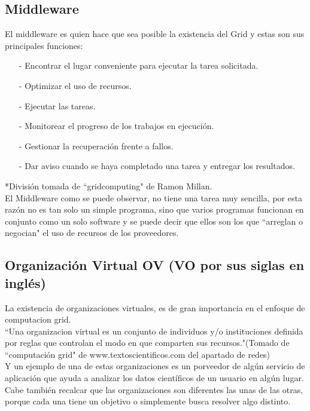 \documentclass[12pt]{article}
\begin{document}
{{\subsection{Middleware}
El middleware es quien hace que sea posible la existencia del Grid y estas son sus principales funciones:
\begin{itemize}
\item[-]Encontrar el lugar conveniente para ejecutar la tarea solicitada.
\item[-]Optimizar el uso de recursos.
\item[-]Ejecutar las tareas.
\item[-]Monitorear el progreso de los trabajos en ejecuci\'on.
\item[-]Gestionar la recuperaci\'on frente a fallos.
\item[-]Dar aviso cuando se haya completado una tarea y entregar los resultados.
\end{itemize}
*Divisi\'on tomada de ``gridcomputing" de Ramon Millan.\\
\vspace{0.2in}
El Middleware como se puede observar, no tiene una tarea muy sencilla, por esta raz\'on no es tan solo un simple programa, sino que varios programas funcionan en conjunto como un solo software y se puede decir que ellos son los que ``arreglan o negocian" \hspace{0.01in} el uso de recursos de los proveedores.

\subsection{Organizaci\'on Virtual OV (VO por sus siglas en ingl\'es)}
La existencia de organizaciones virtuales, es de gran importancia en el enfoque de computacion grid.\\\vspace{0.1in}
``Una organizacion virtual es un conjunto de individuos y/o instituciones definida por reglas que controlan el modo en que comparten sus recursos."(Tomado de ``computaci\'on grid" de www.textoscientificos.com del apartado de redes)\\\vspace{0.1in}
Y un ejemplo de una de estas organizaciones es un porveedor de alg\'un servicio de aplicaci\'on que ayuda a analizar los datos cient\'ificos de un usuario en alg\'un lugar. Cabe tambi\'en recalcar que las organizaciones son diferentes las unas de las otras, porque cada una tiene un objetivo o simplemente busca resolver algo distinto.


}}
\end{document}
